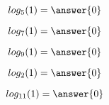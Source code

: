 \documentclass{ximera}
\author{Lee Wayand}
\begin{document}
\begin{example}











\[
log_5(1) = \answer{0}
\]






\[
log_7(1) = \answer{0}
\]






\[
log_9(1) = \answer{0}
\]






\[
log_2(1) = \answer{0}
\]






\[
log_{11}(1) = \answer{0}
\]






\end{example}
\end{document}

